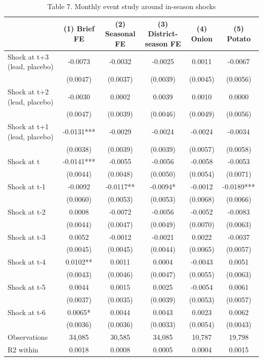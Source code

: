 \begin{table}[htbp]\centering\small
\caption{Table 7. Monthly event study around in-season shocks}\label{tab:table7_event_study}
\begin{tabular}{lccccc}
\toprule
 & (1) Brief FE & (2) Seasonal FE & (3) District-season FE & (4) Onion & (5) Potato \\
\midrule
Shock at t+3 (lead, placebo) & -0.0073 & -0.0032 & -0.0025 & 0.0011 & -0.0067 \\
 & (0.0047) & (0.0037) & (0.0039) & (0.0045) & (0.0056) \\
Shock at t+2 (lead, placebo) & -0.0030 & 0.0002 & 0.0039 & 0.0010 & 0.0000 \\
 & (0.0047) & (0.0039) & (0.0046) & (0.0049) & (0.0056) \\
Shock at t+1 (lead, placebo) & -0.0131*** & -0.0029 & -0.0024 & -0.0024 & -0.0034 \\
 & (0.0038) & (0.0039) & (0.0039) & (0.0057) & (0.0058) \\
Shock at t & -0.0141*** & -0.0055 & -0.0056 & -0.0058 & -0.0053 \\
 & (0.0044) & (0.0048) & (0.0050) & (0.0054) & (0.0071) \\
Shock at t-1 & -0.0092 & -0.0117** & -0.0094* & -0.0012 & -0.0189*** \\
 & (0.0060) & (0.0053) & (0.0053) & (0.0068) & (0.0066) \\
Shock at t-2 & 0.0008 & -0.0072 & -0.0056 & -0.0052 & -0.0083 \\
 & (0.0044) & (0.0047) & (0.0049) & (0.0070) & (0.0063) \\
Shock at t-3 & 0.0052 & -0.0012 & -0.0021 & 0.0022 & -0.0037 \\
 & (0.0045) & (0.0045) & (0.0044) & (0.0065) & (0.0057) \\
Shock at t-4 & 0.0102** & 0.0011 & 0.0004 & -0.0043 & 0.0051 \\
 & (0.0043) & (0.0046) & (0.0047) & (0.0055) & (0.0063) \\
Shock at t-5 & 0.0044 & 0.0015 & 0.0025 & -0.0054 & 0.0061 \\
 & (0.0037) & (0.0035) & (0.0039) & (0.0053) & (0.0057) \\
Shock at t-6 & 0.0065* & 0.0044 & 0.0043 & 0.0023 & 0.0062 \\
 & (0.0036) & (0.0036) & (0.0033) & (0.0054) & (0.0043) \\
\midrule
Observations & 34,085 & 30,585 & 34,085 & 10,787 & 19,798 \\
R2 within & 0.0018 & 0.0008 & 0.0005 & 0.0004 & 0.0015 \\

\end{tabular}
\end{table}
